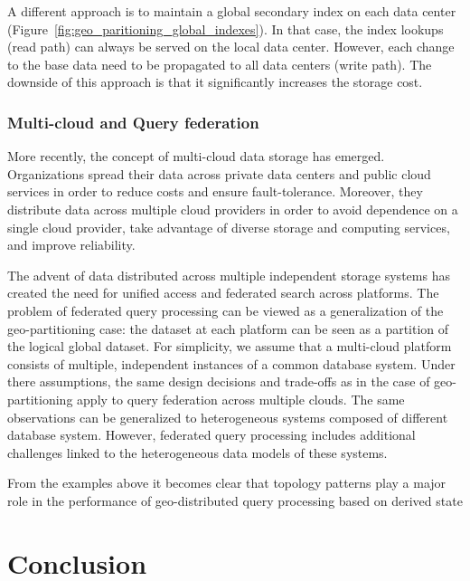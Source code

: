 A different approach is to maintain a global secondary index on each data center (Figure~\ref{fig:geo_paritioning_global_indexes}).
In that case, the index lookups (read path) can always be served on the local data center.
However, each change to the base data need to be propagated to all data centers (write path).
The downside of this approach is that it significantly increases the storage cost.

\subsubsection{Multi-cloud and Query federation}
More recently, the concept of multi-cloud data storage has emerged.
Organizations spread their data across private data centers and public cloud services in order to reduce costs and
ensure fault-tolerance.
Moreover, they distribute data across multiple cloud providers in order to avoid dependence on a single
cloud provider, take advantage of diverse storage and computing services, and improve reliability.

The advent of data distributed across multiple independent storage systems has created the need for unified access and
federated search across platforms.
The problem of federated query processing can be viewed as a generalization of the geo-partitioning case:
the dataset at each platform can be seen as a partition of the logical global dataset.
For simplicity, we assume that a multi-cloud platform consists of multiple, independent instances of a common database
system.
Under there assumptions, the same design decisions and trade-offs as in the case of geo-partitioning apply to query
federation across multiple clouds.
The same observations can be generalized to heterogeneous systems composed of different database system.
However, federated query processing includes additional challenges linked to the heterogeneous data models of these
systems.

From the examples above it becomes clear that topology patterns play a major role in the performance of geo-distributed
query processing based on derived state

\section{Conclusion}



